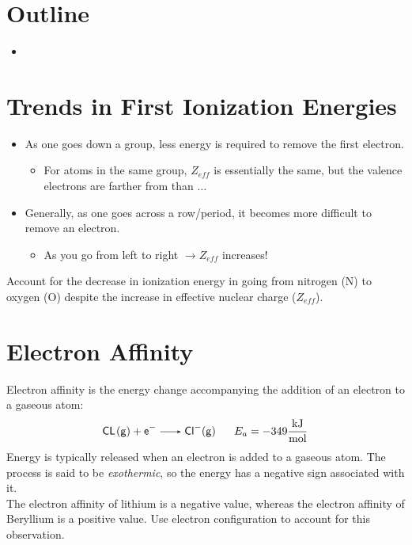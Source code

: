 \documentclass[
	chapter=8,
	title={Periodic Properties of the Elements},
	showanswers=true,
]{chem122notes}
\begin{document}
\section{Outline}\label{sec:outline-8}
\begin{itemize}
	\item
\end{itemize}

\section{Trends in First Ionization Energies}\label{sec:trends-in-first-ionization-energies}
\begin{itemize}
	\item As one goes down a group, less energy is required to remove the first electron.
	\begin{itemize}
		\item For atoms in the same group, $Z_{eff}$ is essentially the same, but the valence electrons are farther from than $\dots$
	\end{itemize}
	\item Generally, as one goes across a row/period, it becomes more difficult to remove an electron.
	\begin{itemize}
		\item As you go from left to right $\rightarrow Z_{eff}$ increases!
	\end{itemize}
\end{itemize}

Account for the decrease in ionization energy in going from nitrogen (N) to oxygen (O) despite the increase in effective nuclear charge ($Z_{eff}$).

\begin{answer}
\end{answer}

\section{Electron Affinity}\label{sec:electron-affinity}
Electron affinity is the energy change accompanying the addition of an electron to a gaseous atom:
\begin{equation*}
\begin{aligned}
	\ce{CL(g) + e- ->  Cl-(g)}\ \ \ \ \ E_{a} = -349 \frac{\mbox{kJ}}{\mbox{mol}}
\end{aligned}
\end{equation*}
Energy is typically released when an electron is added to a gaseous atom.
The process is said to be \emph{exothermic}, so the energy has a negative sign associated with it.\\

The electron affinity of lithium is a negative value, whereas the electron affinity of Beryllium is a positive value.
Use electron configuration to account for this observation.
\end{document}
